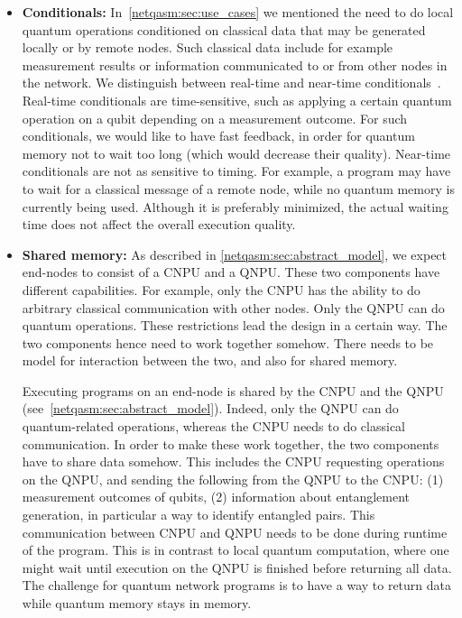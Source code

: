 \begin{itemize}
      \item \label{item:design_cond} \textbf{Conditionals:}
            In~\cref{netqasm:sec:use_cases} we mentioned the need to do local quantum operations conditioned on classical data that may be generated locally or by remote nodes. Such classical data include for example measurement results or information communicated to or from other nodes in the network.
            We distinguish between real-time and near-time conditionals~\cite{cross2021openqasm}.
            Real-time conditionals are time-sensitive, such as applying a certain quantum operation on a qubit depending on a measurement outcome.
            For such conditionals, we would like to have fast feedback, in order for quantum memory not to wait too long (which would decrease their quality).
            Near-time conditionals are not as sensitive to timing.
            For example, a program may have to wait for a classical message of a remote node, while no quantum memory is currently being used.
            Although it is preferably minimized, the actual waiting time does not affect the overall execution quality.


      \item \label{item:design_return} \textbf{Shared memory:}
            As described in \cref{netqasm:sec:abstract_model}, we expect end-nodes to consist of a \ac{CNPU} and a \ac{QNPU}.
            These two components have different capabilities.
            For example, only the \ac{CNPU} has the ability to do arbitrary classical communication with other nodes.
            Only the \ac{QNPU} can do quantum operations.
            These restrictions lead the design in a certain way.
            The two components hence need to work together somehow.
            There needs to be model for interaction between the two, and also for shared memory.

            Executing programs on an end-node is shared by the \ac{CNPU} and the \ac{QNPU} (see~\cref{netqasm:sec:abstract_model}).
            Indeed, only the \ac{QNPU} can do quantum-related operations, whereas the \ac{CNPU} needs to do classical communication.
            In order to make these work together, the two components have to share data somehow.
            This includes the \ac{CNPU} requesting operations on the \ac{QNPU}, and sending the following from the \ac{QNPU} to the \ac{CNPU}:
                (1) measurement outcomes of qubits,
                (2) information about entanglement generation, in particular a way to identify entangled pairs.
            This communication between \ac{CNPU} and \ac{QNPU} needs to be done during runtime of the program.
            This is in contrast to local quantum computation, where one might wait until execution on the \ac{QNPU} is finished before returning all data.
            The challenge for quantum network programs is to have a way to return data while quantum memory stays in memory.


\end{itemize}
